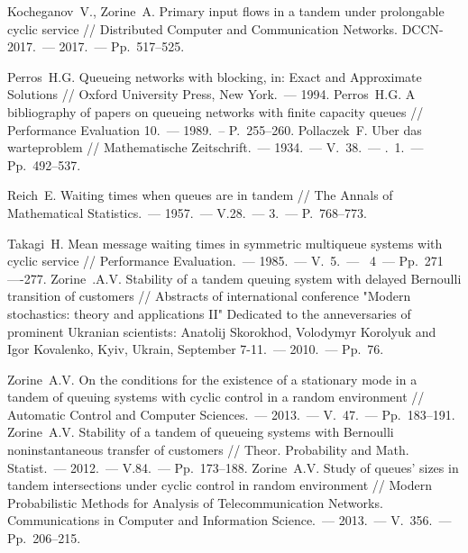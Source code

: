 \documentclass[a4paper,12pt,russian]{extarticle}
\newcommand{\No}{\textnumero}
\begin{document}
\begin{thebibliography}{99}
  Kocheganov~V., Zorine~A. Primary input flows in a tandem under prolongable cyclic service // Distributed Computer and Communication Networks. DCCN-2017.~--- 2017.~--- Pp.~517--525.

 
 Perros~H.G.  Queueing networks with blocking, in: Exact and Approximate Solutions // Oxford University Press, New York.~--- 1994.
 Perros~H.G. A bibliography of papers on queueing networks with finite capacity queues // Performance Evaluation 10.~--- 1989.~-- P.~255–260.
 Pollaczek~F. Uber das warteproblem // Mathematische Zeitschrift.~--- 1934.~--- V.~38.~--- \No{}.~1.~--- Pp.~492--537.

 Reich~E.  Waiting times when queues are in tandem // The Annals of Mathematical Statistics.~--- 1957.~--- V.28.~--- \No{}3.~--- P.~768--773.

 Takagi~H. Mean message waiting times in symmetric multiqueue systems with cyclic service // Performance Evaluation.~--- 1985.~--- V.~5.~--- \No{}~4~--- Pp.~271—-277.  
 Zorine~.A.V. Stability of a tandem queuing system with delayed Bernoulli transition of customers // Abstracts of international conference "Modern stochastics: theory and applications II" Dedicated to the anneversaries of prominent Ukranian scientists: Anatolij Skorokhod, Volodymyr Korolyuk and Igor Kovalenko, Kyiv, Ukrain, September 7-11.~--- 2010.~--- Pp.~76.

 Zorine~A.V. On the conditions for the existence of a stationary mode in a tandem of queuing systems with cyclic control in a random environment // Automatic Control and Computer Sciences.~--- 2013.~--- V.~47.~--- Pp.~183--191.
 Zorine~A.V. Stability of a tandem of queueing systems with Bernoulli noninstantaneous transfer of customers // Theor. Probability and Math. Statist.~--- 2012.~--- V.84.~--- Pp.~173--188.
 Zorine~A.V. Study of queues’ sizes in tandem intersections under cyclic control in random environment // Modern Probabilistic Methods for Analysis of Telecommunication Networks. Communications in Computer and Information Science.~--- 2013.~--- V.~356.~--- Pp.~206--215.

\end{thebibliography}
\end{document}

